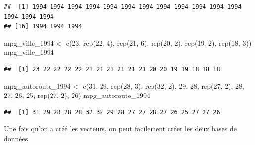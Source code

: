 \documentclass[
]{article}
\newenvironment{Shaded}{\begin{snugshade}}{\end{snugshade}}
\newcommand{\DecValTok}[1]{\textcolor[rgb]{0.00,0.00,0.81}{#1}}
\newcommand{\FunctionTok}[1]{\textcolor[rgb]{0.00,0.00,0.00}{#1}}
\newcommand{\NormalTok}[1]{#1}
\newcommand{\OtherTok}[1]{\textcolor[rgb]{0.56,0.35,0.01}{#1}}
\begin{document}
\begin{verbatim}
##  [1] 1994 1994 1994 1994 1994 1994 1994 1994 1994 1994 1994 1994 1994 1994 1994
## [16] 1994 1994 1994
\end{verbatim}

\begin{Shaded}
\begin{Highlighting}[]
\NormalTok{mpg\_ville\_1994 }\OtherTok{\textless{}{-}} \FunctionTok{c}\NormalTok{(}\DecValTok{23}\NormalTok{, }\FunctionTok{rep}\NormalTok{(}\DecValTok{22}\NormalTok{, }\DecValTok{4}\NormalTok{), }\FunctionTok{rep}\NormalTok{(}\DecValTok{21}\NormalTok{, }\DecValTok{6}\NormalTok{), }\FunctionTok{rep}\NormalTok{(}\DecValTok{20}\NormalTok{, }\DecValTok{2}\NormalTok{), }\FunctionTok{rep}\NormalTok{(}\DecValTok{19}\NormalTok{, }\DecValTok{2}\NormalTok{), }\FunctionTok{rep}\NormalTok{(}\DecValTok{18}\NormalTok{, }\DecValTok{3}\NormalTok{))}
\NormalTok{mpg\_ville\_1994}
\end{Highlighting}
\end{Shaded}

\begin{verbatim}
##  [1] 23 22 22 22 22 21 21 21 21 21 21 20 20 19 19 18 18 18
\end{verbatim}

\begin{Shaded}
\begin{Highlighting}[]
\NormalTok{mpg\_autoroute\_1994 }\OtherTok{\textless{}{-}} \FunctionTok{c}\NormalTok{(}\DecValTok{31}\NormalTok{, }\DecValTok{29}\NormalTok{, }\FunctionTok{rep}\NormalTok{(}\DecValTok{28}\NormalTok{, }\DecValTok{3}\NormalTok{), }\FunctionTok{rep}\NormalTok{(}\DecValTok{32}\NormalTok{, }\DecValTok{2}\NormalTok{), }\DecValTok{29}\NormalTok{, }\DecValTok{28}\NormalTok{, }\FunctionTok{rep}\NormalTok{(}\DecValTok{27}\NormalTok{, }\DecValTok{2}\NormalTok{), }\DecValTok{28}\NormalTok{, }\DecValTok{27}\NormalTok{, }\DecValTok{26}\NormalTok{, }\DecValTok{25}\NormalTok{, }\FunctionTok{rep}\NormalTok{(}\DecValTok{27}\NormalTok{, }\DecValTok{2}\NormalTok{), }\DecValTok{26}\NormalTok{)}
\NormalTok{mpg\_autoroute\_1994}
\end{Highlighting}
\end{Shaded}

\begin{verbatim}
##  [1] 31 29 28 28 28 32 32 29 28 27 27 28 27 26 25 27 27 26
\end{verbatim}

Une fois qu'on a créé les vecteurs, on peut facilement créer les deux
bases de données
\end{document}

